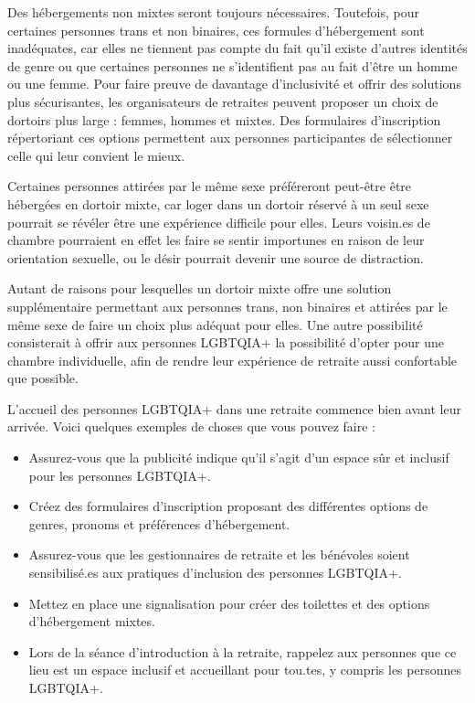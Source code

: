 \documentclass[12pt,openany]{book}
\begin{document}
Des hébergements non mixtes seront toujours nécessaires. Toutefois, pour certaines personnes trans et non binaires, ces formules d’hébergement sont inadéquates, car elles ne tiennent pas compte du fait qu’il existe d’autres identités de genre ou que certaines personnes ne s’identifient pas au fait d’être un homme ou une femme. Pour faire preuve de davantage d’inclusivité et offrir des solutions plus sécurisantes, les organisateurs de retraites peuvent proposer un choix de dortoirs plus large : femmes, hommes et mixtes. Des formulaires d’inscription répertoriant ces options permettent aux personnes participantes de sélectionner celle qui leur convient le mieux.

Certaines personnes attirées par le même sexe préféreront peut-être être hébergées en dortoir mixte, car loger dans un dortoir réservé à un seul sexe pourrait se révéler être une expérience difficile pour elles. Leurs voisin.es de chambre pourraient en effet les faire se sentir importunes en raison de leur orientation sexuelle, ou le désir pourrait devenir une source de distraction.

Autant de raisons pour lesquelles un dortoir mixte offre une solution supplémentaire permettant aux personnes trans, non binaires et attirées par le même sexe de faire un choix plus adéquat pour elles. Une autre possibilité consisterait à offrir aux personnes \mbox{LGBTQIA+} la possibilité d’opter pour une chambre individuelle, afin de rendre leur expérience de retraite aussi confortable que possible.

L’accueil des personnes \mbox{LGBTQIA+} dans une retraite commence bien avant leur arrivée. Voici quelques exemples de choses que vous pouvez faire :

\begin{itemize}[label=\textbullet]
  \setlength\itemsep{-0.3em}
  \item Assurez-vous que la publicité indique qu’il s’agit d’un espace sûr et inclusif pour les personnes \mbox{LGBTQIA+}.
  \item Créez des formulaires d’inscription proposant des différentes options de genres, pronoms et préférences d’hébergement.
  \item Assurez-vous que les gestionnaires de retraite et les bénévoles soient sensibilisé.es aux pratiques d’inclusion des personnes \mbox{LGBTQIA+}.
  \item Mettez en place une signalisation pour créer des toilettes et des options d’hébergement mixtes.
  \item Lors de la séance d’introduction à la retraite, rappelez aux personnes que ce lieu est un espace inclusif et accueillant pour tou.tes, y compris les personnes \mbox{LGBTQIA+}.
\end{itemize}
\end{document}
